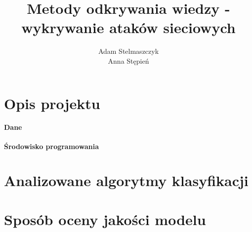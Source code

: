 \documentclass[a4paper, 12pt]{article}
\title {Metody odkrywania wiedzy - wykrywanie ataków sieciowych}
\author {Adam Stelmaszczyk\\ Anna Stępień}
\begin{document}
\maketitle

\tableofcontents

\newpage


\section{Opis projektu}

\paragraph{Dane}

\paragraph{Środowisko programowania}

\section{Analizowane algorytmy klasyfikacji}\label{algorithms}

\section{Sposób oceny jakości modelu}
\end{document}
